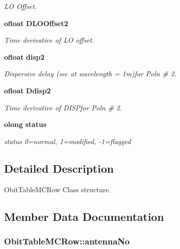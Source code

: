 \begin{CompactItemize}
\begin{CompactList}\small\item\em LO Offset. \item\end{CompactList}\item 
{\bf ofloat} {\bf DLOOffset2}
\begin{CompactList}\small\item\em Time derivative of LO offset. \item\end{CompactList}\item 
{\bf ofloat} {\bf disp2}
\begin{CompactList}\small\item\em Dispersive delay (sec at wavelength = 1m)for Poln \# 2. \item\end{CompactList}\item 
{\bf ofloat} {\bf Ddisp2}
\begin{CompactList}\small\item\em Time derivative of DISPfor Poln \# 2. \item\end{CompactList}\item 
{\bf olong} {\bf status}
\begin{CompactList}\small\item\em status 0=normal, 1=modified, -1=flagged \item\end{CompactList}\end{CompactItemize}


\subsection{Detailed Description}
Obit\-Table\-MCRow Class structure. 



\subsection{Member Data Documentation}
\subsubsection{ {\bf Obit\-Table\-MCRow::antenna\-No}}\label{structObitTableMCRow_o8}


